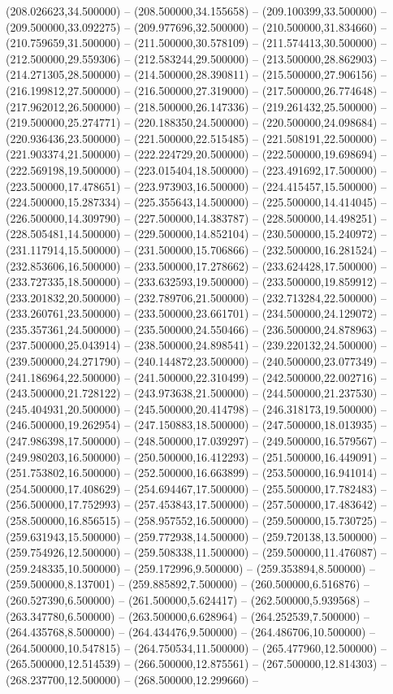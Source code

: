 (208.026623,34.500000) -- (208.500000,34.155658) -- (209.100399,33.500000) -- (209.500000,33.092275) -- (209.977696,32.500000) -- (210.500000,31.834660) -- (210.759659,31.500000) -- (211.500000,30.578109) -- (211.574413,30.500000) -- (212.500000,29.559306) -- (212.583244,29.500000) -- (213.500000,28.862903) -- (214.271305,28.500000) -- (214.500000,28.390811) -- (215.500000,27.906156) -- (216.199812,27.500000) -- (216.500000,27.319000) -- (217.500000,26.774648) -- (217.962012,26.500000) -- (218.500000,26.147336) -- (219.261432,25.500000) -- (219.500000,25.274771) -- (220.188350,24.500000) -- (220.500000,24.098684) -- (220.936436,23.500000) -- (221.500000,22.515485) -- (221.508191,22.500000) -- (221.903374,21.500000) -- (222.224729,20.500000) -- (222.500000,19.698694) -- (222.569198,19.500000) -- (223.015404,18.500000) -- (223.491692,17.500000) -- (223.500000,17.478651) -- (223.973903,16.500000) -- (224.415457,15.500000) -- (224.500000,15.287334) -- (225.355643,14.500000) -- (225.500000,14.414045) -- (226.500000,14.309790) -- (227.500000,14.383787) -- (228.500000,14.498251) -- (228.505481,14.500000) -- (229.500000,14.852104) -- (230.500000,15.240972) -- (231.117914,15.500000) -- (231.500000,15.706866) -- (232.500000,16.281524) -- (232.853606,16.500000) -- (233.500000,17.278662) -- (233.624428,17.500000) -- (233.727335,18.500000) -- (233.632593,19.500000) -- (233.500000,19.859912) -- (233.201832,20.500000) -- (232.789706,21.500000) -- (232.713284,22.500000) -- (233.260761,23.500000) -- (233.500000,23.661701) -- (234.500000,24.129072) -- (235.357361,24.500000) -- (235.500000,24.550466) -- (236.500000,24.878963) -- (237.500000,25.043914) -- (238.500000,24.898541) -- (239.220132,24.500000) -- (239.500000,24.271790) -- (240.144872,23.500000) -- (240.500000,23.077349) -- (241.186964,22.500000) -- (241.500000,22.310499) -- (242.500000,22.002716) -- (243.500000,21.728122) -- (243.973638,21.500000) -- (244.500000,21.237530) -- (245.404931,20.500000) -- (245.500000,20.414798) -- (246.318173,19.500000) -- (246.500000,19.262954) -- (247.150883,18.500000) -- (247.500000,18.013935) -- (247.986398,17.500000) -- (248.500000,17.039297) -- (249.500000,16.579567) -- (249.980203,16.500000) -- (250.500000,16.412293) -- (251.500000,16.449091) -- (251.753802,16.500000) -- (252.500000,16.663899) -- (253.500000,16.941014) -- (254.500000,17.408629) -- (254.694467,17.500000) -- (255.500000,17.782483) -- (256.500000,17.752993) -- (257.453843,17.500000) -- (257.500000,17.483642) -- (258.500000,16.856515) -- (258.957552,16.500000) -- (259.500000,15.730725) -- (259.631943,15.500000) -- (259.772938,14.500000) -- (259.720138,13.500000) -- (259.754926,12.500000) -- (259.508338,11.500000) -- (259.500000,11.476087) -- (259.248335,10.500000) -- (259.172996,9.500000) -- (259.353894,8.500000) -- (259.500000,8.137001) -- (259.885892,7.500000) -- (260.500000,6.516876) -- (260.527390,6.500000) -- (261.500000,5.624417) -- (262.500000,5.939568) -- (263.347780,6.500000) -- (263.500000,6.628964) -- (264.252539,7.500000) -- (264.435768,8.500000) -- (264.434476,9.500000) -- (264.486706,10.500000) -- (264.500000,10.547815) -- (264.750534,11.500000) -- (265.477960,12.500000) -- (265.500000,12.514539) -- (266.500000,12.875561) -- (267.500000,12.814303) -- (268.237700,12.500000) -- (268.500000,12.299660) -- 